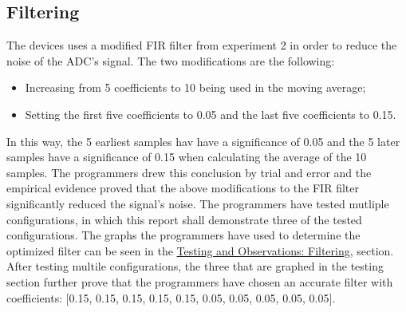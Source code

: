 \documentclass[12pt]{report}
\begin{document}
\subsection{Filtering}
The devices uses a modified FIR filter from experiment 2 in order to reduce the noise of the ADC's signal. The two modifications are the following: 
\begin{itemize}
	\item Increasing from 5 coefficients to 10 being used in the moving average;
	\item Setting the first five coefficients to 0.05 and the last five coefficients to 0.15.
\end{itemize}
In this way, the 5 earliest samples hav have a significance of 0.05 and the 5 later samples have a significance of 0.15 when calculating the average of the 10 samples. The programmers drew this conclusion by trial and error and the empirical evidence proved that the above modifications to the FIR filter significantly reduced the signal's noise. The programmers have tested mutliple configurations, in which this report shall demonstrate three of the tested configurations. The graphs the programmers have used to determine the optimized filter can be seen in the  \hyperref[testfiltering]{Testing and Observations: Filtering}, section. After testing multile configurations, the three that are graphed in the testing section further prove that the programmers have chosen an accurate filter with coefficients: [0.15, 0.15, 0.15, 0.15, 0.15, 0.05, 0.05, 0.05, 0.05, 0.05].

\end{document}
